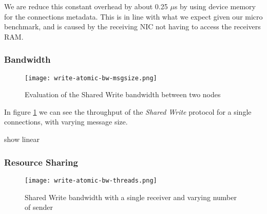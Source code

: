 We are reduce this constant overhead by about 0.25 $\mu$s by using device memory for the connections metadata. This is 
in line with what we expect given our micro benchmark, and is caused by the receiving NIC not having to access the 
receivers RAM.


\subsubsection{Bandwidth}

\begin{figure}[h]
\texttt{[image: write-atomic-bw-msgsize.png]}
\caption{Evaluation of the Shared Write bandwidth between two nodes}
\label{fig:plot-write-atomic-bw}
\end{figure}

In figure \ref{fig:plot-write-atomic-bw} we can see the throughput of the \emph{Shared Write} protocol for a single 
connections, with varying message size. 


show linear


\subsubsection{Resource Sharing}

\begin{figure}[h]
\texttt{[image: write-atomic-bw-threads.png]}
\caption{Shared Write bandwidth with a single receiver and varying number of sender}
\label{fig:plot-write-bw-unack}
\end{figure}





